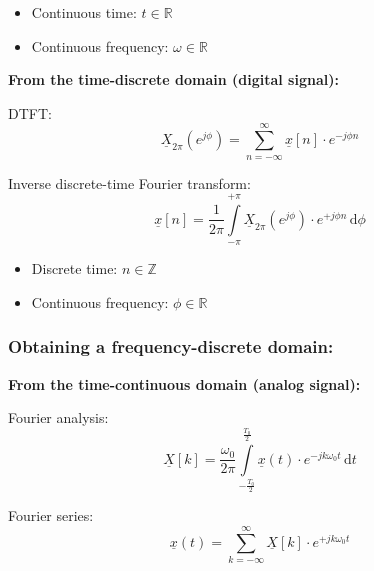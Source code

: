\begin{refsection}
\begin{minipage}{0.45\linewidth}
	\begin{itemize}
		\item Continuous time: $t \in \mathbb{R}$
		\item Continuous frequency: $\omega \in \mathbb{R}$
	\end{itemize}
\end{minipage}
\hfill
\begin{minipage}{0.45\linewidth}
	\textbf{From the time-discrete domain (digital signal):}
	
	\vspace{0.5em}
	
	\acf{DTFT}:
	\begin{equation*}
		\underline{X}_{2\pi}(e^{j \phi}) = \sum\limits_{n = -\infty}^{\infty} \underline{x}[n] \cdot e^{- j \phi n}
	\end{equation*}
	
	Inverse discrete-time Fourier transform:
	\begin{equation*}
		\underline{x}[n] = \frac{1}{2 \pi} \int\limits_{- \pi}^{+ \pi} \underline{X}_{2\pi}(e^{j \phi}) \cdot e^{+ j \phi n} \, \mathrm{d} \phi
	\end{equation*}
	
	\begin{itemize}
		\item Discrete time: $n \in \mathbb{Z}$
		\item Continuous frequency: $\phi \in \mathbb{R}$
	\end{itemize}
\end{minipage}

\subsubsection{Obtaining a frequency-discrete domain:}

\begin{minipage}{0.45\linewidth}
	\textbf{From the time-continuous domain (analog signal):}
	
	\vspace{0.5em}
	
	Fourier analysis:
	\begin{equation*}
		\underline{X}[k] = \frac{\omega_0}{2 \pi} \int\limits_{-\frac{T_0}{2}}^{\frac{T_0}{2}} \underline{x}(t) \cdot e^{-j k \omega_0 t} \, \mathrm{d} t
	\end{equation*}
	
	Fourier series:
	\begin{equation*}
		\underline{x}(t) = \sum\limits_{k = -\infty}^{\infty} \underline{X}[k] \cdot e^{+ j k \omega_0 t}
	\end{equation*}
	

\end{minipage}
\end{refsection}
